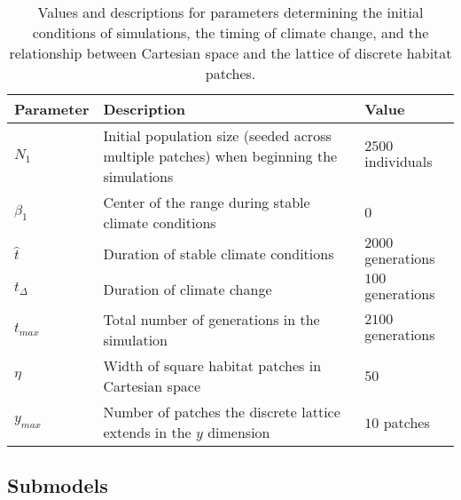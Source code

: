 \documentclass[11pt]{article}
\begin{document}
\begin{table}
\renewcommand{\arraystretch}{1.5}
  \begin{tabular}{ p{2cm} | p{8cm} | p{4cm} }
    \hline
    Parameter & Description & Value \\ \hline \hline
    $N_{1}$ & Initial population size (seeded across multiple patches) when beginning the simulations & $2500$ individuals \\
    $\beta_{1}$ & Center of the range during stable climate conditions & $0$ \\
    $\hat{t}$ & Duration of stable climate conditions & $2000$ generations \\
    $t_{\Delta}$ & Duration of climate change & $100$ generations \\
    $t_{max}$ & Total number of generations in the simulation & $2100$ generations \\
    $\eta$ & Width of square habitat patches in Cartesian space & $50$ \\
    $y_{max}$ & Number of patches the discrete lattice extends in the $y$ dimension & $10$ patches \\
    \hline
  \end{tabular}
\caption[LoF entry]{Values and descriptions for parameters determining the initial conditions of simulations, the timing of climate change, and the relationship between Cartesian space and the lattice of discrete habitat patches.}
\label{table:InitPars}
\end{table}

\subsection*{Submodels}
\end{document}
